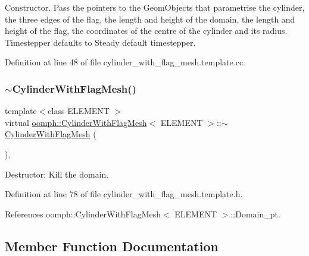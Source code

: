 Constructor. Pass the pointers to the Geom\+Objects that parametrise the cylinder, the three edges of the flag, the length and height of the domain, the length and height of the flag, the coordinates of the centre of the cylinder and its radius. Timestepper defaults to Steady default timestepper. 



Definition at line 48 of file cylinder\+\_\+with\+\_\+flag\+\_\+mesh.\+template.\+cc.

\mbox{\label{classoomph_1_1CylinderWithFlagMesh_a04fb9a6ea7a70eb8dbfb83ef73ed7b48}} 
\subsubsection{\texorpdfstring{$\sim$\+Cylinder\+With\+Flag\+Mesh()}{~CylinderWithFlagMesh()}}
{\footnotesize\ttfamily template$<$class E\+L\+E\+M\+E\+NT $>$ \\
virtual \hyperlink{classoomph_1_1CylinderWithFlagMesh}{oomph\+::\+Cylinder\+With\+Flag\+Mesh}$<$ E\+L\+E\+M\+E\+NT $>$\+::$\sim$\hyperlink{classoomph_1_1CylinderWithFlagMesh}{Cylinder\+With\+Flag\+Mesh} (\begin{DoxyParamCaption}{ }\end{DoxyParamCaption})\hspace{0.3cm}{\ttfamily [inline]}, {\ttfamily [virtual]}}



Destructor\+: Kill the domain. 



Definition at line 78 of file cylinder\+\_\+with\+\_\+flag\+\_\+mesh.\+template.\+h.



References oomph\+::\+Cylinder\+With\+Flag\+Mesh$<$ E\+L\+E\+M\+E\+N\+T $>$\+::\+Domain\+\_\+pt.



\subsection{Member Function Documentation}
\mbox{\label{classoomph_1_1CylinderWithFlagMesh_abfaa03615a4a6f99ddc9100f739cb94f}} 
